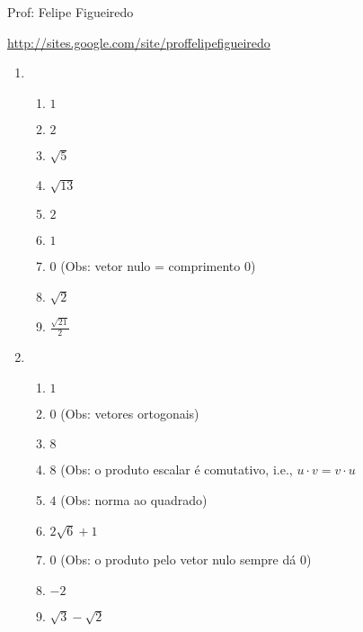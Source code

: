 \documentclass[a4paper]{article}
\begin{document}
\parbox[c]{.825\textwidth}{\raggedright%
{Prof: Felipe Figueiredo\par}
{\url{http://sites.google.com/site/proffelipefigueiredo}}

\vspace{1cm}
}



\begin{enumerate}
\item 

  \begin{enumerate}
  \item $1$
  \item $2$
  \item $\sqrt{5}$
  \item $\sqrt{13}$
  \item $2$
  \item $1$
  \item $0$ (Obs: vetor nulo = comprimento $0$)
  \item $\sqrt{2}$
  \item $\frac{\sqrt{21}}{2}$
  \end{enumerate}

\item 

  \begin{enumerate}
  \item $1$
  \item $0$ (Obs: vetores ortogonais)
  \item $8$
  \item $8$ (Obs: o produto escalar é comutativo, i.e., $u \cdot v = v
    \cdot u$
  \item $4$ (Obs: norma ao quadrado)
  \item $2\sqrt{6}+1$
  \item $0$ (Obs: o produto pelo vetor nulo sempre dá $0$)
  \item $-2$
  \item $\sqrt{3} - \sqrt{2}$
  \end{enumerate}


\end{enumerate}
\end{document}
